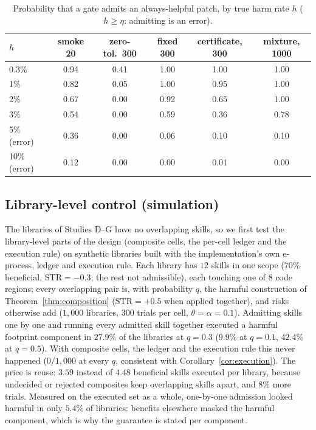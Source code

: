 \begin{table}[t]
\centering\footnotesize
\caption{Probability that a gate admits an always-helpful patch, by true harm rate $h$ ($h\ge\eta$: admitting is an error).}
\label{tab:phase}
\begin{tabular}{@{}lccccc@{}}
\toprule
$h$ & smoke 20 & zero-tol.\ 300 & fixed 300 & certificate, 300 & mixture, 1000 \\
\midrule
0.3\%  & 0.94 & 0.41 & 1.00 & 1.00 & 1.00 \\
1\%    & 0.82 & 0.05 & 1.00 & 0.95 & 1.00 \\
2\%    & 0.67 & 0.00 & 0.92 & 0.65 & 1.00 \\
3\%    & 0.54 & 0.00 & 0.59 & 0.36 & 0.78 \\
5\% (error)  & 0.36 & 0.00 & 0.06 & 0.10 & 0.10 \\
10\% (error) & 0.12 & 0.00 & 0.00 & 0.01 & 0.00 \\
\bottomrule
\end{tabular}
\end{table}

\subsection{Library-level control (simulation)}
\label{sec:eval-library}
The libraries of Studies D--G have no overlapping skills, so we first test the library-level parts of the design (composite cells, the
per-cell ledger and the execution rule) on synthetic libraries built with the implementation's own e-process, ledger and execution
rule.  Each library has $12$ skills in one scope ($70\%$ beneficial, $\mathrm{STR}=-0.3$; the rest not admissible), each touching one of
$8$ code regions; every overlapping pair is, with probability $q$, the harmful construction of Theorem~\ref{thm:composition}
($\mathrm{STR}=+0.5$ when applied together), and risks otherwise add ($1{,}000$ libraries, $300$ trials per cell, $\theta=\alpha=0.1$).
Admitting skills one by one and running every admitted skill together executed a harmful footprint component in $27.9\%$ of the
libraries at $q=0.3$ ($9.9\%$ at $q=0.1$, $42.4\%$ at $q=0.5$).  With composite cells, the ledger and the execution rule this never
happened ($0/1{,}000$ at every $q$, consistent with Corollary~\ref{cor:execution}).  The price is reuse: $3.59$ instead of $4.48$
beneficial skills executed per library, because undecided or rejected composites keep overlapping skills apart, and $8\%$ more trials.
Measured on the executed set as a whole, one-by-one admission looked harmful in only $5.4\%$ of libraries: benefits elsewhere masked the
harmful component, which is why the guarantee is stated per component.
